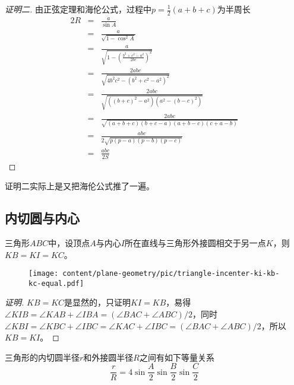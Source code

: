 \begin{proof}[证明二]
  由正弦定理和海伦公式，过程中$p=\frac{1}{2}(a+b+c)$为半周长
  \begin{eqnarray*}
    2R & = & \frac{a}{\sin{A}} \\
       & = & \frac{a}{\sqrt{1-\cos^2{A}}} \\
       & = & \frac{a}{\sqrt{1-\left( \frac{b^2+c^2-a^2}{2bc} \right)^2}} \\
       & = & \frac{2abc}{\sqrt{4b^2c^2-(b^2+c^2-a^2)^2}} \\
       & = & \frac{2abc}{\sqrt{((b+c)^2-a^2)(a^2-(b-c)^2)}} \\
       & = & \frac{2abc}{\sqrt{(a+b+c)(b+c-a)(a+b-c)(c+a-b)}} \\
       & = & \frac{abc}{2 \sqrt{p(p-a)(p-b)(p-c)}} \\
    & = & \frac{abc}{2S}
  \end{eqnarray*}
\end{proof}
证明二实际上是又把海伦公式推了一遍。


\subsection{内切圆与内心}
\label{sec:triangle-incenter}

\begin{property}
  \label{property:triangle-incenter-ki-kb-kc-equal}
  三角形$ABC$中，设顶点$A$与内心$I$所在直线与三角形外接圆相交于另一点$K$，则$KB=KI=KC$。
\end{property}

\begin{figure}[htbp]
\centering
\texttt{[image: content/plane-geometry/pic/triangle-incenter-ki-kb-kc-equal.pdf]}
\caption{}
\label{fig:triangle-incenter-ki-kb-kc-equal}
\end{figure}

\begin{proof}[证明]
  $KB=KC$是显然的，只证明$KI=KB$，易得$\angle KIB=\angle KAB + \angle IBA = (\angle BAC + \angle ABC)/2$，同时$\angle KBI = \angle KBC + \angle IBC = \angle KAC + \angle IBC = (\angle BAC + \angle ABC)/2$，所以$KB=KI$。
\end{proof}

\begin{property}
  \label{property:ration-inradius-and-circumradius-of-triangle}
  三角形的内切圆半径$r$和外接圆半径$R$之间有如下等量关系
  \begin{equation}
    \label{eq:inradius-and-circumradius-ration}
    \frac{r}{R} = 4 \sin{\frac{A}{2}} \sin{\frac{B}{2}} \sin{\frac{C}{2}}
  \end{equation}
\end{property}

